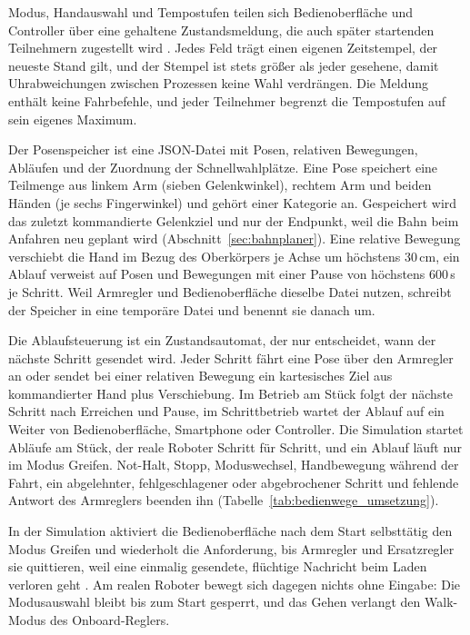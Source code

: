 Modus, Handauswahl und Tempostufen teilen sich Bedienoberfläche und Controller über eine gehaltene Zustandsmeldung, die auch später startenden Teilnehmern zugestellt wird \cite{Macenski2022}.
Jedes Feld trägt einen eigenen Zeitstempel, der neueste Stand gilt, und der Stempel ist stets größer als jeder gesehene, damit Uhrabweichungen zwischen Prozessen keine Wahl verdrängen.
Die Meldung enthält keine Fahrbefehle, und jeder Teilnehmer begrenzt die Tempostufen auf sein eigenes Maximum.

Der Posenspeicher ist eine \ac{JSON}-Datei mit Posen, relativen Bewegungen, Abläufen und der Zuordnung der Schnellwahlplätze.
Eine Pose speichert eine Teilmenge aus linkem Arm (sieben Gelenkwinkel), rechtem Arm und beiden Händen (je sechs Fingerwinkel) und gehört einer Kategorie an.
Gespeichert wird das zuletzt kommandierte Gelenkziel und nur der Endpunkt, weil die Bahn beim Anfahren neu geplant wird (Abschnitt~\ref{sec:bahnplaner}).
Eine relative Bewegung verschiebt die Hand im Bezug des Oberkörpers je Achse um höchstens 30\,cm, ein Ablauf verweist auf Posen und Bewegungen mit einer Pause von höchstens 600\,s je Schritt.
Weil Armregler und Bedienoberfläche dieselbe Datei nutzen, schreibt der Speicher in eine temporäre Datei und benennt sie danach um.

Die Ablaufsteuerung ist ein Zustandsautomat, der nur entscheidet, wann der nächste Schritt gesendet wird.
Jeder Schritt fährt eine Pose über den Armregler an oder sendet bei einer relativen Bewegung ein kartesisches Ziel aus kommandierter Hand plus Verschiebung.
Im Betrieb am Stück folgt der nächste Schritt nach Erreichen und Pause, im Schrittbetrieb wartet der Ablauf auf ein Weiter von Bedienoberfläche, Smartphone oder Controller.
Die Simulation startet Abläufe am Stück, der reale Roboter Schritt für Schritt, und ein Ablauf läuft nur im Modus Greifen.
Not-Halt, Stopp, Moduswechsel, Handbewegung während der Fahrt, ein abgelehnter, fehlgeschlagener oder abgebrochener Schritt und fehlende Antwort des Armreglers beenden ihn (Tabelle~\ref{tab:bedienwege_umsetzung}).

In der Simulation aktiviert die Bedienoberfläche nach dem Start selbsttätig den Modus Greifen und wiederholt die Anforderung, bis Armregler und Ersatzregler sie quittieren, weil eine einmalig gesendete, flüchtige Nachricht beim Laden verloren geht \cite{Macenski2022}.
Am realen Roboter bewegt sich dagegen nichts ohne Eingabe: Die Modusauswahl bleibt bis zum Start gesperrt, und das Gehen verlangt den Walk-Modus des Onboard-Reglers.


